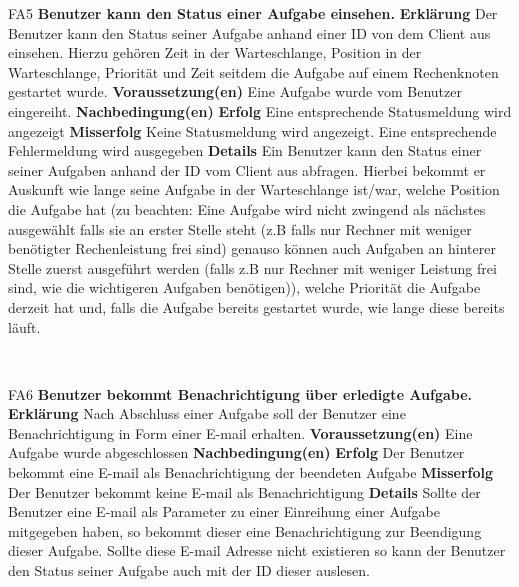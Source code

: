 \documentclass[a4paper,12pt]{article}
\begin{document}
\begin{itemize}[nosep]
	\begin{minipage}[t]{\linewidth}
		\item[FA5] \textbf{\gls{Benutzer} kann den Status einer Aufgabe einsehen.}
		\subitem \textbf{Erklärung} Der \gls{Benutzer} kann den Status seiner Aufgabe anhand einer ID von dem Client aus einsehen. Hierzu gehören Zeit in der Warteschlange, Position in der Warteschlange, Priorität und Zeit seitdem die Aufgabe auf einem Rechenknoten gestartet wurde.
		\subitem \textbf{Voraussetzung(en)} Eine Aufgabe wurde vom \gls{Benutzer} eingereiht.
		\subitem \textbf{Nachbedingung(en)}
		\subsubitem \textbf{Erfolg} Eine entsprechende Statusmeldung wird angezeigt
		\subsubitem \textbf{Misserfolg} Keine Statusmeldung wird angezeigt. Eine entsprechende Fehlermeldung wird ausgegeben
		\subitem \textbf{Details} Ein \gls{Benutzer} kann den Status einer seiner Aufgaben anhand der ID vom \gls{Client} aus abfragen. Hierbei bekommt er Auskunft wie lange seine Aufgabe in der Warteschlange ist/war, welche Position die Aufgabe hat (zu beachten: Eine Aufgabe wird nicht zwingend als nächstes ausgewählt falls sie an erster Stelle steht (z.B falls nur Rechner mit weniger benötigter Rechenleistung frei sind) genauso können auch Aufgaben an hinterer Stelle zuerst ausgeführt werden (falls z.B nur Rechner mit weniger Leistung frei sind, wie die wichtigeren Aufgaben benötigen)), welche Priorität die Aufgabe derzeit hat und, falls die Aufgabe bereits gestartet wurde, wie lange diese bereits läuft.
	\end{minipage}
	\newline
	\\
	
	
	\begin{minipage}[t]{\linewidth}
		\item[FA6] \textbf{\gls{Benutzer} bekommt Benachrichtigung über erledigte Aufgabe.}
		\subitem \textbf{Erklärung} Nach Abschluss einer Aufgabe soll der \gls{Benutzer} eine Benachrichtigung in Form einer E-mail erhalten.
		\subitem \textbf{Voraussetzung(en)} Eine Aufgabe wurde abgeschlossen
		\subitem \textbf{Nachbedingung(en)}
		\subsubitem \textbf{Erfolg} Der \gls{Benutzer} bekommt eine E-mail als Benachrichtigung der beendeten Aufgabe
		\subsubitem \textbf{Misserfolg} Der \gls{Benutzer} bekommt keine E-mail als Benachrichtigung
		\subitem \textbf{Details} Sollte der \gls{Benutzer} eine E-mail als Parameter zu einer Einreihung einer Aufgabe mitgegeben haben, so bekommt dieser eine Benachrichtigung zur Beendigung dieser Aufgabe. Sollte diese E-mail Adresse nicht existieren so kann der Benutzer den Status seiner Aufgabe auch mit der ID dieser auslesen.
    \end{minipage}	
	\newline
	\\
	

\end{itemize}
\end{document}
